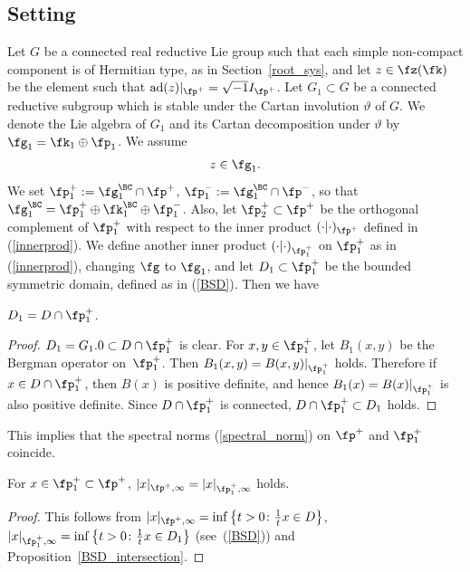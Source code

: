 \subsection{Setting}
Let $G$ be a connected real reductive Lie group such that each simple non-compact component is of Hermitian type, as in Section~\ref{root_sys},
and let $z\in\fz(\fk)$ be the element such that $\operatorname{ad}(z)|_{\fp^+}=\sqrt{-1}I_{\fp^+}$.
Let $G_1\subset G$ be a connected reductive subgroup which is stable under the Cartan involution $\vartheta$ of $G$.
We denote the Lie algebra of $G_1$ and its Cartan decomposition under $\vartheta$ by $\fg_1=\fk_1\oplus \fp_1$. We assume
\begin{gather}\label{assumption}
z\in \fg_1.
\end{gather}
We set $\fp_1^+:=\fg_1^\BC\cap \fp^+$, $\fp_1^-:=\fg_1^\BC\cap \fp^-$, so that
$\fg_1^\BC=\fp^+_1\oplus \fk^\BC_1\oplus \fp^-_1$.
Also, let $\fp_2^+\subset\fp^+$ be the orthogonal complement of $\fp^+_1$ with respect to the inner product $(\cdot|\cdot)_{\fp^+}$
defined in (\ref{innerprod}).
We define another inner product $(\cdot|\cdot)_{\fp^+_1}$ on $\fp^+_1$ as in (\ref{innerprod}), changing $\fg$ to $\fg_1$,
and let $D_1\subset\fp^+_1$ be the bounded symmetric domain, defined as in (\ref{BSD}). Then we have
\begin{Proposition}\label{BSD_intersection}
$D_1=D\cap \fp^+_1$.
\end{Proposition}
\begin{proof}$D_1=G_1.0\subset D\cap\fp^+_1$ is clear. For $x,y\in \fp^+_1$, let $B_1(x,y)$ be the Bergman operator on~$\fp^+_1$.
Then $B_1(x,y)=B(x,y)|_{\fp^+_1}$ holds. Therefore if $x\in D\cap \fp^+_1$, then $B(x)$ is positive definite,
and hence $B_1(x)=B(x)|_{\fp^+_1}$ is also positive definite. Since $D\cap \fp^+_1$ is connected, $D\cap\fp^+_1\subset D_1$ holds.
\end{proof}

This implies that the spectral norms (\ref{spectral_norm}) on $\fp^+$ and $\fp^+_1$ coincide.
\begin{Corollary}
For $x\in\fp^+_1\subset\fp^+$, $|x|_{\fp^+,\infty}=|x|_{\fp^+_1,\infty}$ holds.
\end{Corollary}
\begin{proof}This follows from $|x|_{\fp^+,\infty}=\inf\left\{t>0\colon \frac{1}{t}x\in D\right\}$,
$|x|_{\fp^+_1,\infty}=\inf\left\{t>0\colon \frac{1}{t}x\in D_1\right\}$ \linebreak (see~(\ref{BSD})) and Proposition~\ref{BSD_intersection}.
\end{proof}

